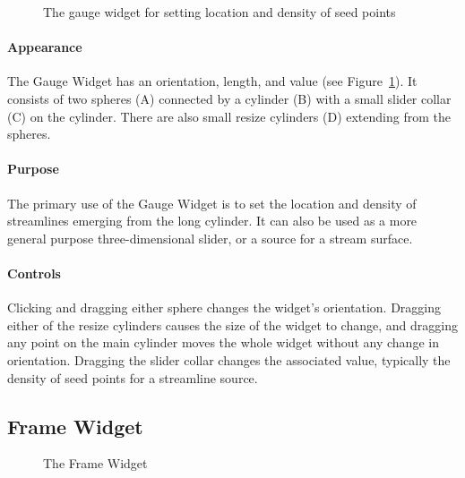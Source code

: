 \begin{figure}[htb]
  \begin{makeimage}
  \end{makeimage}
  \gaugewidget
  \caption{\label{fig:gaugewidget} The gauge widget for setting location and
    density of seed points}
\end{figure}

\paragraph{Appearance} The Gauge
Widget has an orientation, length, and value (see Figure~\ref{fig:gaugewidget}). It consists of two spheres (A) connected by a cylinder (B) with a
small slider collar (C) on the cylinder.  There are also small resize
cylinders (D) extending from the spheres.

\paragraph{Purpose} The primary use of the Gauge Widget is to set the
location and density of streamlines emerging from the long cylinder.  It
can also be used as a more general purpose three-dimensional slider, or a
source for a stream surface. 

\paragraph{Controls} Clicking and dragging either sphere changes the widget's orientation.  Dragging either of the resize
cylinders causes the size of the widget to change, and dragging any point on
the main cylinder moves the whole widget without any change in orientation.
Dragging the slider collar changes the associated value, typically the
density of seed points for a streamline source.

\subsection{Frame Widget}
\label{sec:view-framewidget} 

\begin{figure}[htb]
  \begin{makeimage}
  \end{makeimage}
  \framewidget
  \caption{\label{fig:framewidget} The Frame Widget}
\end{figure}


